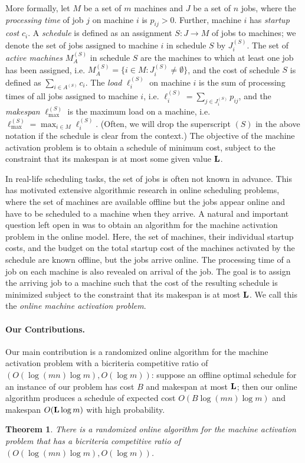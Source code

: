 \documentclass[11pt]{article}
\newtheorem{theorem}{Theorem}
\begin{document}
More formally, let $M$ be a set of $m$ machines and $J$ be a set of $n$ jobs, 
where the {\em processing time} of job $j$ on machine $i$ is $p_{ij} > 0$.
Further, machine $i$ has {\em startup cost} $c_i$. A {\em schedule}
is defined as an assignment $S: J\rightarrow M$ of jobs to machines; we denote
the set of jobs assigned to machine $i$ in schedule $S$ by $J^{(S)}_i$. 
The set of {\em active machines} $M^{(S)}_A$ in schedule $S$ are the machines 
to which at least one job has been assigned, i.e. 
$M^{(S)}_A = \{i\in M: J^{(S)}_i \not= \emptyset\}$, and the cost of schedule $S$ 
is defined as $\sum_{i\in A^{(S)}} c_i$. The {\em load} $\ell^{(S)}_i$ on machine $i$
is the sum of processing times of all jobs assigned to machine $i$, 
i.e. $\ell^{(S)}_i = \sum_{j\in J^{(S)}_i} p_{ij}$, and the {\em makespan}
$\ell^{(S)}_{\max}$ is the maximum load on a machine, i.e.
$\ell^{(S)}_{\max} = \max_{i\in M} \ell^{(S)}_i$. (Often, we will drop the 
superscript $(S)$ in the above notation if the schedule is clear from the context.) 
The objective of the machine activation problem is to obtain a schedule of minimum 
cost, subject to the constraint that its makespan is at most some given value $\bf L$.

In real-life scheduling tasks, the set of jobs is often not known in advance.
This has motivated extensive algorithmic research in online scheduling problems, 
where the  set of machines are available offline but the jobs appear online 
and have to be scheduled to a machine when they arrive. A natural and 
important question left open in \cite{KhullerLS10} was to obtain an algorithm for 
the machine activation problem in the online model. Here, the set of machines,
their individual startup costs, and the budget on the total startup cost of the 
machines activated by the schedule are known offline, but the jobs arrive online.
The processing time of a job on each machine is also revealed on arrival of the 
job. The goal is to assign the arriving job to a machine such that the cost
of the resulting schedule is minimized subject to the constraint that its makespan
is at most $\bf L$. We call this the {\em online machine activation problem}.

\noindent
\paragraph{Our Contributions.} 
Our main contribution is a randomized online algorithm 
for the machine activation problem with a bicriteria competitive ratio of 
$(O(\log (mn)\log m), O(\log m))$: suppose an offline 
optimal schedule for an instance of our problem has cost $B$ and makespan at most $\bf L$; 
then our online algorithm produces a schedule of expected
cost $O(B\log (mn)\log m)$ and makespan $O({\bf L}\log m)$
with high probability. 
\begin{theorem}
\label{thm:main}
There is a randomized online algorithm for the machine activation problem that
has a bicriteria competitive ratio of $(O(\log (mn)\log m), O(\log m))$.
\end{theorem}
\end{document}
